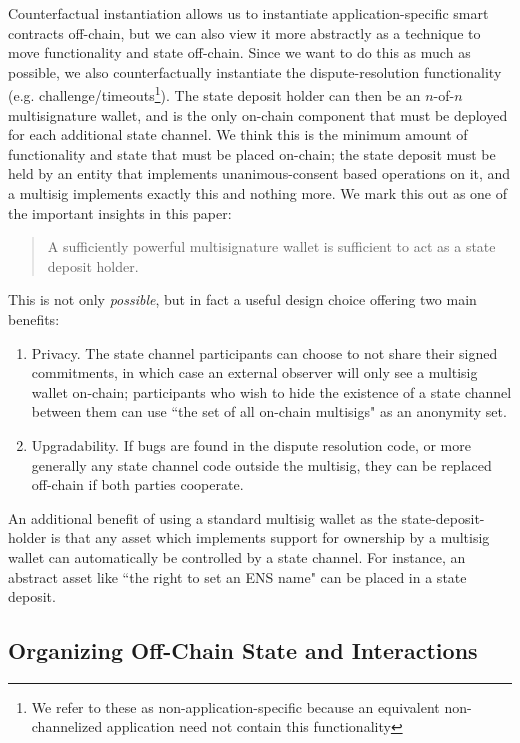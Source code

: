 \documentclass[prb,floatfix,reprint,nofootinbib,amsmath,amssymb,epsfig,pre,floats,letterpaper,groupedaffiliation,tightenlines,allcolors=blue,11pt]{revtex4}
\theoremstyle{definition}
\theoremstyle{definition}
\theoremstyle{definition}
\begin{document}
Counterfactual instantiation allows us to instantiate application-specific smart contracts off-chain, but we can also view it more abstractly as a technique to move functionality and state off-chain. Since we want to do this as much as possible, we also counterfactually instantiate the dispute-resolution functionality (e.g. challenge/timeouts\footnote{We refer to these as non-application-specific because an equivalent non-channelized application need not contain this functionality}). The state deposit holder can then be an $n$-of-$n$ multisignature wallet, and is the only on-chain component that must be deployed for each additional state channel. We think this is the minimum amount of functionality and state that must be placed on-chain; the state deposit must be held by an entity that implements unanimous-consent based operations on it, and a multisig implements exactly this and nothing more. We mark this out as one of the important insights in this paper:

\begin{quote}
A sufficiently powerful multisignature wallet is sufficient to act as a state deposit holder.
\end{quote}

This is not only \textit{possible}, but in fact a useful design choice offering two main benefits:

\begin{enumerate}
  \item Privacy. The state channel participants can choose to not share their signed commitments, in which case an external observer will only see a multisig wallet on-chain; participants who wish to hide the existence of a state channel between them can use ``the set of all on-chain multisigs" as an anonymity set.
  \item Upgradability. If bugs are found in the dispute resolution code, or more generally any state channel code outside the multisig, they can be replaced off-chain if both parties cooperate.
\end{enumerate}

An additional benefit of using a standard multisig wallet as the state-deposit-holder is that any asset which implements support for ownership by a multisig wallet can automatically be controlled by a state channel. For instance, an abstract asset like ``the right to set an ENS name" can be placed in a state deposit.

\subsection{Organizing Off-Chain State and Interactions}
\end{document}
